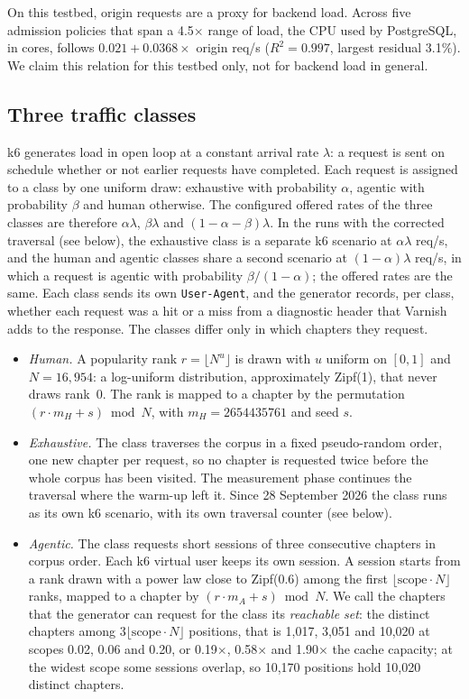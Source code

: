 On this testbed, origin requests are a proxy for backend load.
Across five admission policies that span a 4.5$\times$ range of load, the CPU used by
PostgreSQL, in cores, follows $0.021 + 0.0368 \times$ origin req/s ($R^2 = 0.997$,
largest residual 3.1\%).
We claim this relation for this testbed only, not for backend load in
general.

\subsection{Three traffic classes}\label{sec:m-classes}
k6 generates load in open loop at a constant arrival rate $\lambda$: a request is sent on
schedule whether or not earlier requests have completed.
Each request is assigned to a class by one uniform draw: exhaustive with probability
$\alpha$, agentic with probability $\beta$ and human otherwise.
The configured offered rates of the three classes are therefore $\alpha\lambda$,
$\beta\lambda$ and $(1-\alpha-\beta)\lambda$.
In the runs with the corrected traversal (see below), the exhaustive class is a separate k6
scenario at $\alpha\lambda$ req/s, and the human and agentic classes share a second
scenario at $(1-\alpha)\lambda$ req/s, in which a request is agentic with probability
$\beta/(1-\alpha)$; the offered rates are the same.
Each class sends its own \texttt{User-Agent}, and the generator records, per class,
whether each request was a hit or a miss from a diagnostic header that Varnish adds to
the response.
The classes differ only in which chapters they request.
\begin{itemize}
\item \emph{Human.} A popularity rank $r = \lfloor N^{u} \rfloor$ is drawn with $u$
  uniform on $[0,1]$ and $N = 16{,}954$: a log-uniform distribution, approximately
  Zipf(1), that never draws rank~0.
  The rank is mapped to a chapter by the permutation $(r \cdot m_H + s) \bmod N$, with
  $m_H = 2654435761$ and seed $s$.
\item \emph{Exhaustive.} The class traverses the corpus in a fixed pseudo-random order,
  one new chapter per request, so no chapter is requested twice before the whole corpus
  has been visited.
  The measurement phase continues the traversal where the warm-up left it.
  Since 28 September 2026 the class runs as its own k6 scenario, with its own traversal
  counter (see below).
\item \emph{Agentic.} The class requests short sessions of three consecutive chapters in
  corpus order.
  Each k6 virtual user keeps its own session.
  A session starts from a rank drawn with a power law close to Zipf(0.6) among the first
  $\lfloor \mathrm{scope} \cdot N \rfloor$ ranks, mapped to a chapter by
  $(r \cdot m_A + s) \bmod N$.
  We call the chapters that the generator can request for the class its \emph{reachable
  set}: the distinct chapters among $3\lfloor \mathrm{scope} \cdot N \rfloor$ positions,
  that is 1,017, 3,051 and 10,020 at scopes 0.02, 0.06 and 0.20, or 0.19$\times$,
  0.58$\times$ and 1.90$\times$ the cache capacity; at the widest scope some sessions
  overlap, so 10,170 positions hold 10,020 distinct chapters.
\end{itemize}
